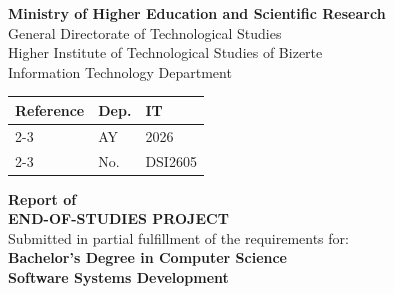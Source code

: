 \begin{titlepage}
\noindent
\begin{minipage}[t]{0.20\textwidth}
  \vspace{0pt}
\end{minipage}
\hfill
\begin{minipage}[t]{0.50\textwidth}
  \vspace{0pt}
  \centering
  {\fontsize{10}{12}\selectfont
  \textbf{Ministry of Higher Education and Scientific Research}\\[2pt]
  General Directorate of Technological Studies\\[2pt]
  Higher Institute of Technological Studies of Bizerte\\[2pt]
  Information Technology Department}
\end{minipage}
\hfill
\begin{minipage}[t]{0.22\textwidth}
  \vspace{0pt}
  \raggedleft
\end{minipage}

\vspace{0.4cm}
\noindent
{\fontsize{10.5}{12.6}\selectfont
\begin{tabular}{|l|l|l|}
  \hline
  \multirow{3}{*}{\textbf{Reference}} & \textbf{Dep.} & IT \\
  \cline{2-3}
   & AY & 2026 \\
  \cline{2-3}
   & No. & DSI2605 \\
  \hline
\end{tabular}
}

\vspace{0.5cm}
\begin{center}
{\fontsize{14}{16.8}\selectfont \textbf{Report of}}\\[0.3cm]
{\fontsize{20}{24}\selectfont \textbf{END-OF-STUDIES PROJECT}}\\[0.3cm]
{\fontsize{14}{16.8}\selectfont Submitted in partial fulfillment of the requirements for:}\\[0.2cm]
{\fontsize{16}{19.2}\selectfont \textbf{Bachelor’s Degree in Computer Science}}\\[0.3cm]
{\fontsize{16}{19.2}\selectfont \textbf{Software Systems Development}}\\[0.3cm]
\end{center}


\end{titlepage}
